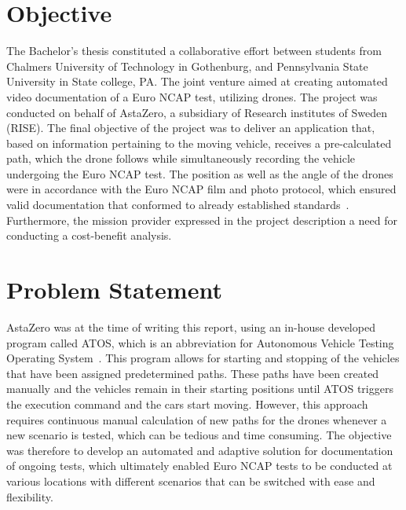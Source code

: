 \section{Objective} \label{Objective}
The Bachelor's thesis constituted a collaborative effort between students from Chalmers University of Technology in Gothenburg, and Pennsylvania State University in State college, PA. The joint venture aimed at creating automated video documentation of a Euro NCAP test, utilizing drones. The project was conducted on behalf of AstaZero, a subsidiary of Research institutes of Sweden (RISE). The final objective of the project was to deliver an application that, based on information pertaining to the moving vehicle, receives a pre-calculated path, which the drone follows while simultaneously recording the vehicle undergoing the Euro NCAP test. The position as well as the angle of the drones were in accordance with the Euro NCAP film and photo protocol, which ensured valid documentation that conformed to already established standards~\cite{EuroNCAP2021FILMPROTOCOL}. Furthermore, the mission provider expressed in the project description a need for conducting a cost-benefit analysis. 
\bigskip
\newline 

\section{Problem Statement} \label{chap:problem statement}

AstaZero was at the time of writing this report, using an in-house developed program called ATOS, which is an abbreviation for Autonomous Vehicle Testing Operating System~\cite{AstaZero2023ATOS:Systems.}. This program allows for starting and stopping of the vehicles that have been assigned predetermined paths. These paths have been created manually and the vehicles remain in their starting positions until ATOS triggers the execution command and the cars start moving. However, this approach requires continuous manual calculation of new paths for the drones whenever a new scenario is tested, which can be tedious and time consuming. The objective was therefore to develop an automated and adaptive solution for documentation of ongoing tests, which ultimately enabled Euro NCAP tests to be conducted at various locations with different scenarios that can be switched with ease and flexibility.
\bigskip
\newline

